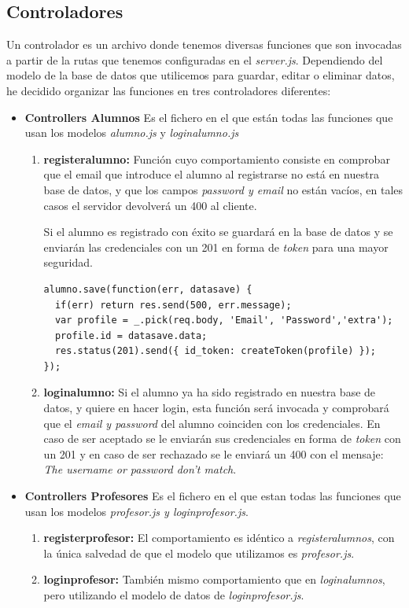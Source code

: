 \subsection{Controladores} Un controlador es un archivo donde tenemos diversas funciones que son invocadas a partir de la rutas que tenemos configuradas en el \textit{server.js}. Dependiendo del modelo de la base de datos que utilicemos para guardar, editar o eliminar datos, he decidido organizar las funciones en tres controladores diferentes:

\begin{itemize}
\item \textbf{Controllers Alumnos} Es el fichero en el que están todas las funciones que usan los modelos \textit{alumno.js} y \textit{loginalumno.js}
\begin{enumerate}
    \item \textbf {registeralumno: } Función cuyo comportamiento consiste en comprobar que el email que introduce el alumno al registrarse no está en nuestra base de datos, y que los campos \textit{password y email} no están vacíos, en tales casos el servidor devolverá un 400 al cliente.

    Si el alumno es registrado con éxito se guardará en la base de datos y se enviarán las credenciales con un 201 en forma de \textit{token} para una mayor seguridad.

    \begin{lstlisting}
alumno.save(function(err, datasave) {
  if(err) return res.send(500, err.message);
  var profile = _.pick(req.body, 'Email', 'Password','extra');
  profile.id = datasave.data;
  res.status(201).send({ id_token: createToken(profile) });
});
    \end{lstlisting}

    \item \textbf {loginalumno: } Si el alumno ya ha sido registrado en nuestra base de datos, y quiere en hacer login, esta función será invocada y comprobará que el \textit{email y password} del alumno coinciden con los credenciales. En caso de ser aceptado se le enviarán sus credenciales en forma de \textit{token} con un 201 y en caso de ser rechazado se le enviará un 400 con el mensaje: \textit{The username or password don't match}.

\end{enumerate}
\item \textbf{Controllers Profesores} Es el fichero en el que estan todas las funciones que usan los modelos \textit{profesor.js y loginprofesor.js}.
\begin{enumerate}
    \item \textbf {registerprofesor: }El comportamiento es idéntico a \textit{registeralumnos}, con la única salvedad de que el modelo que utilizamos es \textit{profesor.js}.
    \item \textbf {loginprofesor: } También mismo comportamiento que en \textit{loginalumnos}, pero utilizando el modelo de datos de \textit{loginprofesor.js}.


\end{enumerate}
\end{itemize}

